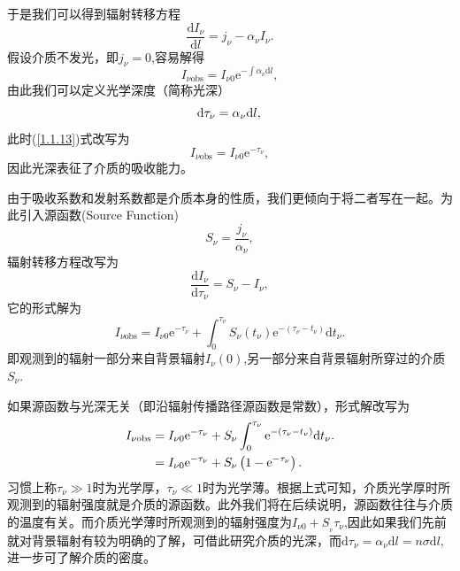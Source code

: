 \documentclass[../天体物理基础.tex]{subfiles}
\begin{document}
于是我们可以得到辐射转移方程
\begin{equation}
\frac{\mathrm{d}I_{\nu}}{\mathrm{d}l}=j_{\nu}-\alpha_{\nu}I_{\nu}.
\end{equation}
假设介质不发光，即$j_{\nu}=0$,容易解得
\begin{equation}
I_{\nu\text{obs}}=I_{\nu0}\mathrm{e}^{-\int\alpha_{\nu}\mathrm{d}l},\label{1.1.13}
\end{equation}
由此我们可以定义光学深度（简称光深）
\begin{equation}
\mathrm{d}\tau_\nu=\alpha_{\nu}\mathrm{d}l,\\
\end{equation}
此时(\ref{1.1.13})式改写为
\begin{equation}
I_{\nu\text{obs}}=I_{\nu0}\mathrm{e}^{-\tau_{\nu}},\label{1.1.15}
\end{equation}
因此光深表征了介质的吸收能力。

由于吸收系数和发射系数都是介质本身的性质，我们更倾向于将二者写在一起。为此引入源函数(Source Function)
\begin{equation}
S_{\nu}=\frac{j_{\nu}}{\alpha_{\nu}},
\end{equation}
辐射转移方程改写为
\begin{equation}
\frac{\mathrm{d}I_{\nu}}{\mathrm{d}\tau_{\nu}}=S_{\nu}-I_{\nu},
\end{equation}
它的形式解为
\begin{equation}
I_{\nu\text{obs}}=I_{\nu0}\mathrm{e}^{-\tau_{\nu}}+\int^{\tau_{\nu}}_{0}S_{\nu}\left(t_{\nu}\right)\mathrm{e}^{-\left(\tau_{\nu}-t_{\nu}\right)}\mathrm{d}t_{\nu}.
\end{equation}
即观测到的辐射一部分来自背景辐射$I_{\nu}\left(0\right)$,另一部分来自背景辐射所穿过的介质$S_{\nu}$.

如果源函数与光深无关（即沿辐射传播路径源函数是常数），形式解改写为
\begin{align}
I_{\nu\text{obs}}&=I_{\nu0}\mathrm{e}^{-\tau_{\nu}}+S_{\nu}\int^{\tau_{\nu}}_{0}\mathrm{e}^{-\left(\tau_{\nu}-t_{\nu}\right)}\mathrm{d}t_{\nu}.\notag\\
&=I_{\nu0}\mathrm{e}^{-\tau_{\nu}}+S_{\nu}\left(1-\mathrm{e}^{-\tau_{\nu}}\right).
\end{align}
习惯上称$\tau_{\nu}\gg1$时为光学厚，$\tau_{\nu}\ll1$时为光学薄。根据上式可知，介质光学厚时所观测到的辐射强度就是介质的源函数。此外我们将在后续说明，源函数往往与介质的温度有关。而介质光学薄时所观测到的辐射强度为$I_{\nu0}+S_{_{\nu}}\tau_{\nu}$,因此如果我们先前就对背景辐射有较为明确的了解，可借此研究介质的光深，而$\mathrm{d}\tau_{\nu}=\alpha_{\nu}\mathrm{d}l=n\sigma\mathrm{d}l$,进一步可了解介质的密度。
\end{document}
